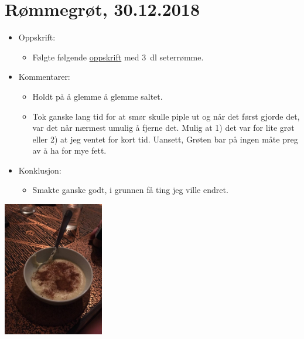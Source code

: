 \documentclass[12pt]{article}
\begin{document}
\section*{Rømmegrøt, 30.12.2018}
\begin{itemize}
\item Oppskrift:
  \begin{itemize}
  \item F{\o}lgte følgende
    \href{https://www.matprat.no/oppskrifter/tradisjon/rommegrot/}{oppskrift}
    med 3~dl seterr{\o}mme.  
  \end{itemize}
\item Kommentarer:
  \begin{itemize}
  \item Holdt på å glemme å glemme saltet.        
  \item Tok ganske lang tid for at smør skulle piple ut og
    når det f{\o}rst gjorde det, var det når nærmest umulig
    å fjerne det. Mulig at 1) det var for lite grøt eller
    2) at jeg ventet for kort tid. Uansett, Grøten bar på
    ingen måte preg av å ha for mye fett.
  \end{itemize}
\item Konklusjon:
  \begin{itemize}
  \item Smakte ganske godt, i grunnen få ting jeg ville endret.
  \end{itemize}
\end{itemize}
\centering
\includegraphics[width=0.33\textwidth]{30-12-2018.jpg}
\end{document}
